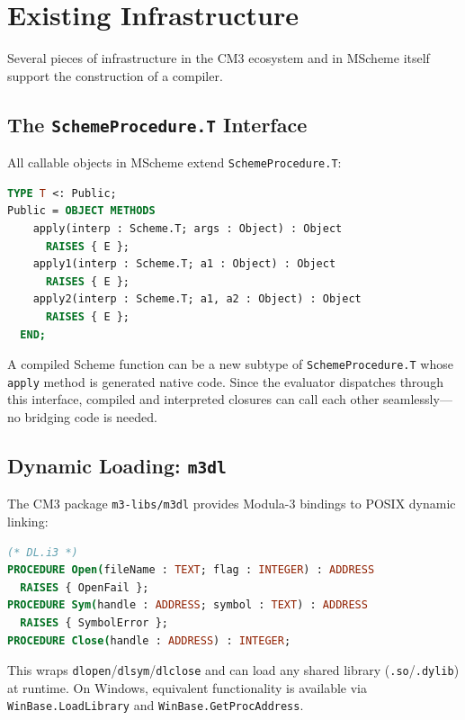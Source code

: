 \documentclass[12pt]{report}
\begin{document}
\chapter{Existing Infrastructure}
\label{ch:infra}

Several pieces of infrastructure in the CM3 ecosystem and in MScheme
itself support the construction of a compiler.

\section{The \texttt{SchemeProcedure.T} Interface}
\label{sec:proctype}

All callable objects in MScheme extend \texttt{SchemeProcedure.T}:

\begin{lstlisting}[language=Modula3]
TYPE T <: Public;
Public = OBJECT METHODS
    apply(interp : Scheme.T; args : Object) : Object
      RAISES { E };
    apply1(interp : Scheme.T; a1 : Object) : Object
      RAISES { E };
    apply2(interp : Scheme.T; a1, a2 : Object) : Object
      RAISES { E };
  END;
\end{lstlisting}

A compiled Scheme function can be a new subtype of
\texttt{SchemeProcedure.T} whose \texttt{apply} method is generated
native code.  Since the evaluator dispatches through this interface,
compiled and interpreted closures can call each other seamlessly---no
bridging code is needed.

\section{Dynamic Loading: \texttt{m3dl}}
\label{sec:m3dl}

The CM3 package \texttt{m3-libs/m3dl} provides Modula-3 bindings to
POSIX dynamic linking:

\begin{lstlisting}[language=Modula3]
(* DL.i3 *)
PROCEDURE Open(fileName : TEXT; flag : INTEGER) : ADDRESS
  RAISES { OpenFail };
PROCEDURE Sym(handle : ADDRESS; symbol : TEXT) : ADDRESS
  RAISES { SymbolError };
PROCEDURE Close(handle : ADDRESS) : INTEGER;
\end{lstlisting}

This wraps \texttt{dlopen}/\texttt{dlsym}/\texttt{dlclose} and
can load any shared library (\texttt{.so}/\texttt{.dylib}) at
runtime.  On Windows, equivalent functionality is available via
\texttt{WinBase.LoadLibrary} and \texttt{WinBase.GetProcAddress}.
\end{document}
